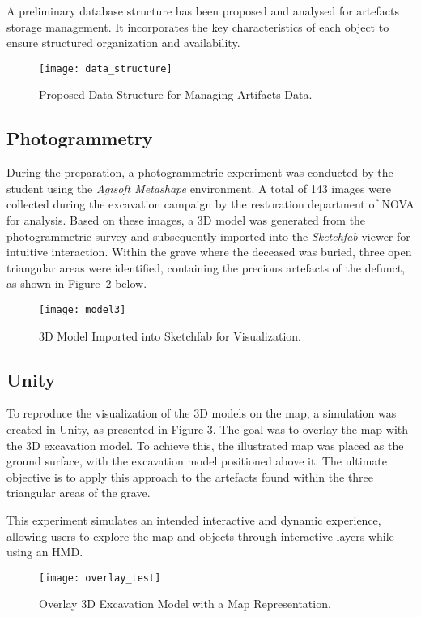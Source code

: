 A preliminary database structure has been proposed and analysed for artefacts storage management.  
It incorporates the key characteristics of each object to ensure structured organization and availability.

\begin{figure}[h!]
    \centering
    \texttt{[image: data\_structure]}
    \caption{Proposed Data Structure for Managing Artifacts Data.}
    \label{fig:data_strucutre}
\end{figure}
\FloatBarrier

\subsection{Photogrammetry}
\label{sec:photogrammetry_previous} 

During the preparation, a photogrammetric experiment was conducted by the student using the \textit{Agisoft Metashape} environment. A total of 143 images were collected during the excavation campaign by the restoration department of NOVA for analysis. 
Based on these images, a \gls{3D} model was generated from the photogrammetric survey and subsequently imported into the \textit{Sketchfab} viewer for intuitive interaction.
Within the grave where the deceased was buried, three open triangular areas were identified, containing the precious artefacts of the defunct, as shown in Figure~\ref{fig:model3} below.

\begin{figure}[h!]
    \centering
    \texttt{[image: model3]}
    \caption{\gls{3D} Model Imported into Sketchfab for Visualization.}
    \label{fig:model3}
\end{figure}
\FloatBarrier

\subsection{Unity}
\label{sec:unity} 

To reproduce the visualization of the \gls{3D} models on the map, a simulation was created in Unity, as presented in Figure \ref{fig:overlay}. The goal was to overlay the map with the \gls{3D} excavation model.
To achieve this, the illustrated map was placed as the ground surface, with the excavation model positioned above it. The ultimate objective is to apply this approach to the artefacts found within the three triangular areas of the grave.

This experiment simulates an intended interactive and dynamic experience, allowing users to explore the map and objects through interactive layers while using an \gls{HMD}.

\begin{figure}[h!]
    \centering
    \texttt{[image: overlay\_test]}
    \caption{Overlay \gls{3D} Excavation Model with a Map Representation.}
    \label{fig:overlay}
\end{figure}
\FloatBarrier

